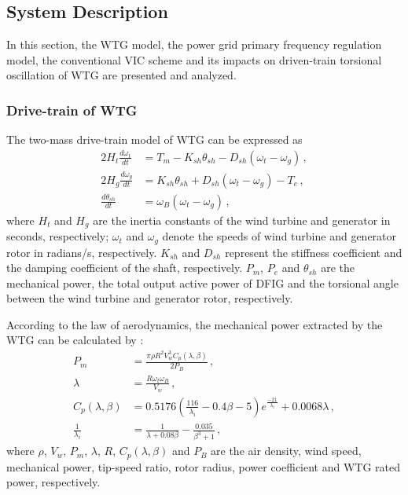 \documentclass[journal]{IEEEtran}
\begin{document}
\subsection{System Description}
In this section, the WTG model, the power grid primary frequency regulation model, the conventional VIC scheme and its impacts on driven-train torsional oscillation of WTG are presented and analyzed.

\subsubsection{Drive-train of WTG}
The two-mass drive-train model of WTG can be expressed as \cite{MaHybrid}
%
\begin{equation}
  \label{Eq.9}
  \begin{aligned}
    2H_t\frac{d\omega_t}{dt} &= T_m-K_{sh}\theta_{sh}-D_{sh}(\omega_t-\omega_g) \, , \\
    2H_g\frac{d \omega_g}{dt} &= K_{sh}\theta_{sh} + D_{sh}(\omega_t-\omega_g)-T_e \, , \\
    \frac{d\theta_{sh}}{dt} &= \omega_B(\omega_t-\omega_g) \, ,
  \end{aligned}
\end{equation}
where $H_t$ and $H_g$ are the inertia constants of the wind turbine and generator in seconds, respectively;  $\omega_t$ and $\omega_g$ denote the speeds of wind turbine and generator rotor in radians/s, respectively.
$K_{sh}$ and $D_{sh}$ represent the stiffness coefficient and the damping coefficient of the shaft, respectively. $P_m$, $P_e$ and $\theta_{sh}$ are the mechanical power, the total output active power of DFIG and the torsional angle between the wind turbine and generator rotor, respectively.

According to the law of aerodynamics, the mechanical power extracted by the WTG can be calculated by \cite{Bhende2016Frequency}:
%
\begin{equation}
  \label{Eq.10}
  \begin{aligned}
    P_m&=\frac{\pi \rho R^2V_w^3C_p(\lambda,\beta)}{2P_B} \, , \\
    \lambda&=\frac{R\omega_t\omega_B}{V_w} \, , \\
    C_p(\lambda,\beta)&=0.5176(\frac{116}{\lambda_i} -
    0.4\beta-5)e^{\frac{-21}{\lambda_i}} + 0.0068\lambda \, , \\
    \frac{1}{\lambda_i}&=\frac{1}{\lambda+0.08\beta}-\frac{0.035}{\beta^3+1} \, , 
  \end{aligned}
\end{equation}
% 
where $\rho$, $V_w$, $P_m$, $\lambda$, $R$, $C_p(\lambda,\beta)$ and $P_B$ are the air density, wind speed, mechanical power, tip-speed ratio, rotor radius, power coefficient and WTG rated power, respectively.
\end{document}
